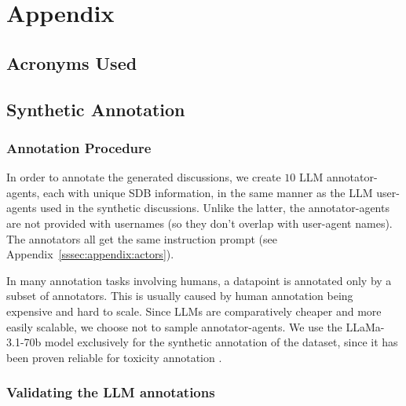 \section{Appendix}
\label{sec:appendix}

\subsection{Acronyms Used}

\begin{acronym}[WWW] %
\end{acronym}

\subsection{Synthetic Annotation}
\label{ssec:appendix:annotation}

\subsubsection{Annotation Procedure}

In order to annotate the generated discussions, we create $10$ \ac{LLM} annotator-agents, each with unique \ac{SDB} information, in the same manner as the \ac{LLM} user-agents used in the synthetic discussions. Unlike the latter, the annotator-agents are not provided with usernames (so they don't overlap with user-agent names). The annotators all get the same instruction prompt (see Appendix~\ref{sssec:appendix:actors}).

In many annotation tasks involving humans, a datapoint is annotated only by a subset of annotators. This is usually caused by human annotation being expensive and hard to scale. Since \acp{LLM} are comparatively cheaper and more easily scalable, we choose not to sample annotator-agents. We use the LLaMa-3.1-70b model exclusively for the synthetic annotation of the dataset, since it has been proven reliable for toxicity annotation \cite{koh-etal-2024-llms}. 


\subsubsection{Validating the LLM annotations}

